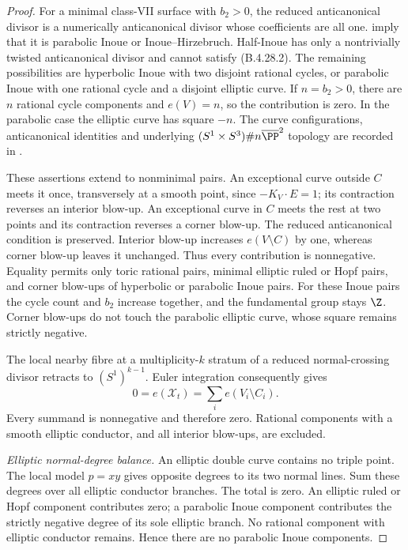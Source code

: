 \begin{proof}
For a minimal class-VII surface with $b_2>0$, the
reduced anticanonical divisor is a numerically
anticanonical divisor whose coefficients are all one.
\citet[Corollary 2.25, Lemma 2.26 and Proposition
2.27]{Dloussky2005AB} imply that it is parabolic Inoue
or Inoue--Hirzebruch. Half-Inoue has only a nontrivially
twisted anticanonical divisor and cannot satisfy
(B.4.28.2). The remaining possibilities are hyperbolic
Inoue with two disjoint rational cycles, or parabolic
Inoue with one rational cycle and a disjoint elliptic
curve. If $n=b_2>0$, there are $n$ rational cycle
components and $e(V)=n$, so the contribution is zero.
In the parabolic case the elliptic curve has square
$-n$. The curve configurations, anticanonical identities
and underlying $(S^1\times S^3)\#n\overline{\PP}^2$
topology are recorded in
\citet[Sections 3.2--3.3]{FujikiPontecorvo2010AB}.

These assertions extend to nonminimal pairs. An
exceptional curve outside $C$ meets it once, transversely
at a smooth point, since $-K_V\cdot E=1$; its contraction
reverses an interior blow-up. An exceptional curve in
$C$ meets the rest at two points and its contraction
reverses a corner blow-up. The reduced anticanonical
condition is preserved. Interior blow-up increases
$e(V\setminus C)$ by one, whereas corner blow-up leaves
it unchanged. Thus every contribution is nonnegative.
Equality permits only toric rational pairs, minimal
elliptic ruled or Hopf pairs, and corner blow-ups of
hyperbolic or parabolic Inoue pairs. For these Inoue
pairs the cycle count and $b_2$ increase together, and
the fundamental group stays $\Z$. Corner blow-ups do
not touch the parabolic elliptic curve, whose square
remains strictly negative.

The local nearby fibre at a multiplicity-$k$ stratum
of a reduced normal-crossing divisor retracts to
$(S^1)^{k-1}$. Euler integration consequently gives
\[
 0=e(\mathcal X_t)=\sum_i e(V_i\setminus C_i).          \tag{B.4.28.4}
\]
Every summand is nonnegative and therefore zero.
Rational components with a smooth elliptic conductor,
and all interior blow-ups, are excluded.

\emph{Elliptic normal-degree balance.}
An elliptic double curve contains no triple point.
The local model $p=xy$ gives opposite degrees to its
two normal lines. Sum these degrees over all elliptic
conductor branches. The total is zero. An elliptic
ruled or Hopf component contributes zero; a parabolic
Inoue component contributes the strictly negative
degree of its sole elliptic branch. No rational
component with elliptic conductor remains. Hence there
are no parabolic Inoue components.


\end{proof}
